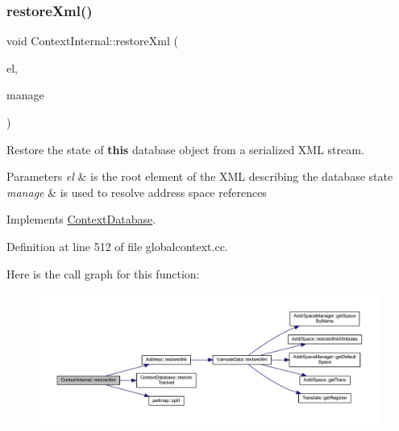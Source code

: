 \subsubsection{\texorpdfstring{restoreXml()}{restoreXml()}}
{\footnotesize\ttfamily void Context\+Internal\+::restore\+Xml (\begin{DoxyParamCaption}\item[{const \mbox{\hyperlink{class_element}{Element}} $\ast$}]{el,  }\item[{const \mbox{\hyperlink{class_addr_space_manager}{Addr\+Space\+Manager}} $\ast$}]{manage }\end{DoxyParamCaption})\hspace{0.3cm}{\ttfamily [virtual]}}



Restore the state of {\bfseries{this}} database object from a serialized X\+ML stream. 


\begin{DoxyParams}{Parameters}
{\em el} & is the root element of the X\+ML describing the database state \\
\hline
{\em manage} & is used to resolve address space references \\
\hline
\end{DoxyParams}


Implements \mbox{\hyperlink{class_context_database_a779b5bcb5326d79e748a3dc9df0137d0}{Context\+Database}}.



Definition at line 512 of file globalcontext.\+cc.

Here is the call graph for this function\+:
\nopagebreak
\begin{figure}[H]
\begin{center}
\leavevmode
\includegraphics[width=350pt]{class_context_internal_acaa68fc13719dbed6a06ec20d04bc6bf_cgraph}
\end{center}
\end{figure}
\mbox{\label{class_context_internal_a98a632ce5decb052fdf7057d6b6433ed}} 
